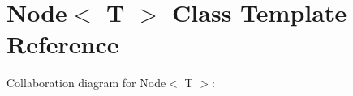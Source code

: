 \hypertarget{classList}{}\section{Node$<$ T $>$ Class Template Reference}
\label{classList}


Collaboration diagram for Node$<$ T $>$\+:
